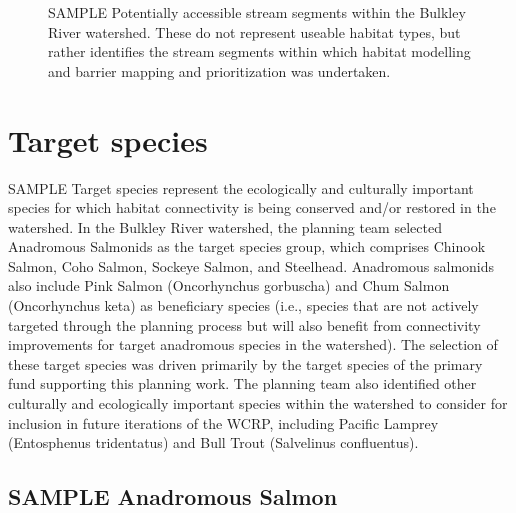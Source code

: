 \documentclass[
  letterpaper,
  DIV=11,
  numbers=noendperiod]{scrreprt}
\begin{document}
\begin{figure}


\caption{\label{fig-strseg}SAMPLE Potentially accessible stream segments
within the Bulkley River watershed. These do not represent useable
habitat types, but rather identifies the stream segments within which
habitat modelling and barrier mapping and prioritization was
undertaken.}

\end{figure}%

\section*{Target species}\label{target-species}


SAMPLE Target species represent the ecologically and culturally
important species for which habitat connectivity is being conserved
and/or restored in the watershed. In the Bulkley River watershed, the
planning team selected Anadromous Salmonids as the target species group,
which comprises Chinook Salmon, Coho Salmon, Sockeye Salmon, and
Steelhead. Anadromous salmonids also include Pink Salmon (Oncorhynchus
gorbuscha) and Chum Salmon (Oncorhynchus keta) as beneficiary species
(i.e., species that are not actively targeted through the planning
process but will also benefit from connectivity improvements for target
anadromous species in the watershed). The selection of these target
species was driven primarily by the target species of the primary fund
supporting this planning work. The planning team also identified other
culturally and ecologically important species within the watershed to
consider for inclusion in future iterations of the WCRP, including
Pacific Lamprey (Entosphenus tridentatus) and Bull Trout (Salvelinus
confluentus).

\subsection*{SAMPLE Anadromous Salmon}\label{sample-anadromous-salmon}
\end{document}

